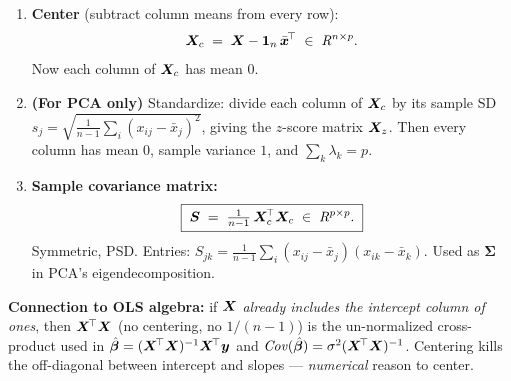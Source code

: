 \begin{enumerate}
\item \textbf{Center} (subtract column means from every row):
$$\bm{X}_c \;=\; \bm{X} - \bm{1}_n\,\bar{\bm{x}}^{\!\top} \;\in\; \mathit{R}^{n\times p}.$$
Now each column of $\bm{X}_c$ has mean $0$.

\item \textbf{(For PCA only)} Standardize: divide each column of $\bm{X}_c$
by its sample SD $s_j=\sqrt{\tfrac{1}{n-1}\sum_i(x_{ij}-\bar x_j)^2}$,
giving the $z$-score matrix $\bm{X}_z$. Then every column has mean $0$,
sample variance $1$, and $\sum_k \lambda_k = p$.

\item \textbf{Sample covariance matrix:}
$$\boxed{\;\bm{S} \;=\; \tfrac{1}{n-1}\,\bm{X}_c^{\!\top} \bm{X}_c \;\in\; \mathit{R}^{p\times p}.\;}$$
Symmetric, PSD. Entries: $S_{jk}=\tfrac{1}{n-1}\sum_i (x_{ij}-\bar x_j)(x_{ik}-\bar x_k)$.
Used as $\bm\Sigma$ in PCA's eigendecomposition.
\end{enumerate}

\textbf{Connection to OLS algebra:} if $\bm{X}$ \emph{already includes the
intercept column of ones}, then $\bm{X}^{\!\top}\bm{X}$ (no centering, no $1/(n{-}1)$)
is the un-normalized cross-product used in $\hat{\bm{\beta}}=(\bm{X}^{\!\top}\bm{X})^{-1}\bm{X}^{\!\top}\bm{y}$
and $\mathop{\mathit{Cov}}(\hat{\bm{\beta}})=\sigma^2(\bm{X}^{\!\top}\bm{X})^{-1}$. Centering kills the off-diagonal
between intercept and slopes — \emph{numerical} reason to center.
